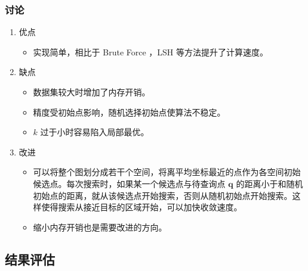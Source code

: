 \documentclass{article}
\newcommand{\tb}[1]{\textbf{#1}}
\begin{document}
\subsubsection*{讨论}
\begin{enumerate}
\item 优点
		\begin{itemize}
				\item 实现简单，相比于 Brute Force ，LSH 等方法提升了计算速度。
		\end{itemize}
\item 缺点
		\begin{itemize}
				\item 数据集较大时增加了内存开销。
				\item 精度受初始点影响，随机选择初始点使算法不稳定。
				\item $k$ 过于小时容易陷入局部最优。
		\end{itemize}
\item 改进
		\begin{itemize}
				\item 可以将整个图划分成若干个空间，将离平均坐标最近的点作为各空间初始候选点。每次搜索时，如果某一个候选点与待查询点 $\tb q$ 的距离小于和随机初始点的距离，就从该候选点开始搜索，否则从随机初始点开始搜索。这样使得搜索从接近目标的区域开始，可以加快收敛速度。
				\item 缩小内存开销也是需要改进的方向。
		\end{itemize}
\end{enumerate}

\subsection{结果评估}
\end{document}
